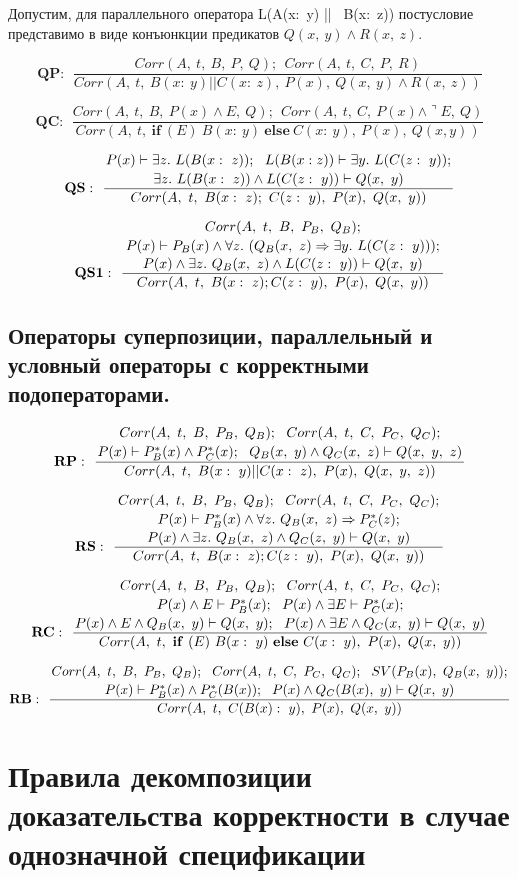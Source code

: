 \documentclass[10pt,a4paper]{article}
\newcommand{\ruleI}[3] {
$$
\mathbf{#1:} ~~
\frac{#2}{#3}
$$
}
\newcommand{\ruleII}[4] {
\ruleI{#1}
{\genfrac{}{}{0pt}{0}{#2}{#3}}
{#4}
}
\newcommand{\ruleIII}[5] {
\ruleII{#1}
{\genfrac{}{}{0pt}{0}{#2}{#3}}
{#4}
{#5}
}
\begin{document}
Допустим, для параллельного оператора L(A(x: y) ||  B(x: z)) постусловие представимо в виде конъюнкции предикатов $ Q(x,~y) \land R(x,~z) $.

\ruleI{QP}
{Corr(A,~t,~B,~P,~Q);~~Corr(A,~t,~C,~P,~R)}
{Corr(A,~t,~B(x:~y)||C(x:~z),~P(x),~Q(x,~y) \land R(x,~z))}

\ruleI{QC}
{Corr(A,~t,~B,~P(x) \land E,~Q);~~Corr(A,~t,~C,~P(x) \land \urcorner E,~Q)}
{Corr(A,~t, ~\mathbf{if}~(E)~B(x:~y)~\mathbf{else}~C(x:~y),~P(x),~Q(x, y))}

\ruleII{QS}
{P(x) \vdash \exists z.~L(B(x:~z));~~L(B(x: z)) \vdash \exists y.~L(C(z:~y));}
{\exists z.~L(B(x:~z)) \land L(C(z:~y)) \vdash Q(x,~y)}
{Corr(A,~t,~B(x:~z);~C(z:~y),~P(x),~Q(x,~y))}

\ruleIII{QS1}
{Corr(A,~t,~B,~P_B,~Q_B);}
{P(x) \vdash P_B(x) \land \forall z.~(Q_B(x,~z) \Rightarrow \exists y.~L(C(z:~y)));}
{P(x) \land \exists z.~Q_B(x,~z) \land L(C(z:~y)) \vdash Q(x,~y)}
{Corr(A,~t,~B(x:~z);C(z:~y),~P(x),~Q(x,~y))}

\subsection{Операторы суперпозиции, параллельный и условный операторы с корректными подоператорами.}

\ruleII{RP}
{Corr(A,~t,~B,~P_B,~Q_B);~~Corr(A,~t,~C,~P_C,~Q_C);}
{P(x) \vdash P^*_B(x) \land P^*_C(x);~~Q_B(x,~y) \land Q_C(x,~z) \vdash Q(x,~y,~z)}
{Corr(A,~t,~B(x:~y)||C(x:~z),~P(x),~Q(x,~y,~z))}

\ruleIII{RS}
{Corr(A,~t,~B,~P_B,~Q_B);~~Corr(A,~t,~C,~P_C,~Q_C);}
{P(x) \vdash P^*_B(x) \land \forall z.~Q_B(x,~z) \Rightarrow P^*_C(z);}
{P(x) \land \exists z.~Q_B(x,~z) \land Q_C(z,~y) \vdash Q(x,~y)}
{Corr(A,~t,~B(x:~z);C(z:~y),~P(x),~Q(x,~y))}

\ruleIII{RC}
{Corr(A,~t,~B,~P_B,~Q_B);~~Corr(A,~t,~C,~P_C,~Q_C);}
{P(x) \land E \vdash P^*_B(x);~~P(x) \land \exists E \vdash P^*_C(x);}
{P(x) \land E \land Q_B(x,~y)\vdash Q(x,~y);~~P(x) \land \exists E \land Q_C(x,~y) \vdash Q(x,~y)}
{Corr(A,~t,~\mathbf{if}~(E)~B(x:~y)~\mathbf{else}~C(x:~y),~P(x),~Q(x,~y))}

\ruleII{RB}
{Corr(A,~t,~B,~P_B,~Q_B);~~Corr(A,~t,~C,~P_C,~Q_C);~~SV(P_B(x),~Q_B(x,~y));}
{P(x) \vdash P^*_B(x) \land P^*_C(B(x));~~P(x) \land Q_C(B(x),~y) \vdash Q(x,~y)}
{Corr(A,~t,~C(B(x):~y),~P(x),~Q(x,~y))}

\section{Правила декомпозиции доказательства корректности в случае однозначной спецификации}
\end{document}
